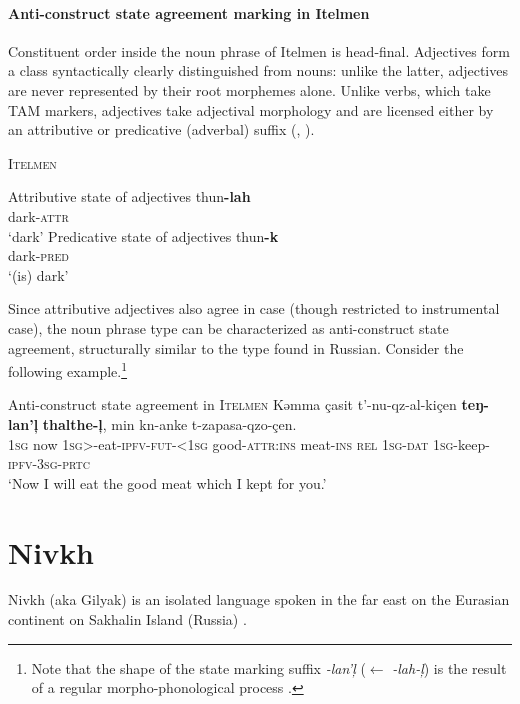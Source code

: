\paragraph{Anti-construct state agreement marking in Itelmen} \label{itelmen synchr}
Constituent order inside the noun phrase of Itelmen is head-final. Adjectives form a class syntactically clearly distinguished from nouns: unlike the latter, adjectives are never represented by their root morphemes alone. Unlike verbs, which take TAM markers, adjectives take adjectival morphology and are licensed either by an attributive or predicative (adverbal) suffix (\citealt{volodin1997}, \citealt[54]{georg-etal1999}).
\begin{exe}
\ex \textsc{Itelmen} \citep{volodin1997} \label{itelmen ex}
\begin{xlist}
\ex Attributive state of adjectives
\gll	thun\textbf{-lah}\\
	dark-\textsc{attr}\\
\glt	‘dark’
\ex Predicative state of adjectives
\gll	thun\textbf{-k}\\
	dark-\textsc{pred}\\
\glt	‘(is) dark’
\end{xlist}
\end{exe}
Since attributive adjectives also agree in case (though restricted to instrumental case), the noun phrase type can be characterized as anti-construct state agreement, structurally similar to the type found in Russian. Consider the following example.\footnote{Note that the shape of the state marking suffix \textit{-lan'ļ} ($\leftarrow$ \textit{-lah-ļ}) is the result of a regular morpho-phonological process \citep{georg-etal1999}.}

\begin{exe}
\ex Anti-construct state agreement in \textsc{Itelmen} \cite{georg-etal1999}
\gll	Kəmma çasit t'-nu-qz-al-kiçen \textbf{teŋ-lan'ļ} \textbf{thalthe-ļ}, min kn-anke t-zapasa-qzo-çen.\\
	\textsc{1sg} now \textsc{1sg}>-eat-\textsc{ipfv-fut-<1sg} good-\textsc{attr:ins} meat-\textsc{ins} \textsc{rel} \textsc{1sg-dat} \textsc{1sg}-keep-\textsc{ipfv-3sg-prtc}\\
\glt	‘Now I will eat the good meat which I kept for you.’
\end{exe}

\section{Nivkh}
Nivkh (aka Gilyak) is an isolated language spoken in the far east on the Eurasian continent on Sakhalin Island (Russia) \citep[222–223]{salminen2007}.


